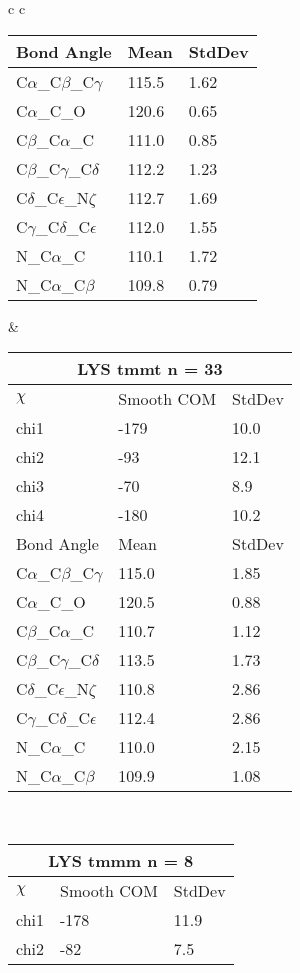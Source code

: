 \begin{longtable}{ c c }
\begin{tabular}{ l l l }
  Bond Angle   & Mean     & StdDev \\ \midrule
  C$\alpha$\_C$\beta$\_C$\gamma$ & 115.5 & 1.62\\
  C$\alpha$\_C\_O & 120.6 & 0.65\\
  C$\beta$\_C$\alpha$\_C & 111.0 & 0.85\\
  C$\beta$\_C$\gamma$\_C$\delta$ & 112.2 & 1.23\\
  C$\delta$\_C$\epsilon$\_N$\zeta$ & 112.7 & 1.69\\
  C$\gamma$\_C$\delta$\_C$\epsilon$ & 112.0 & 1.55\\
  N\_C$\alpha$\_C & 110.1 & 1.72\\
  N\_C$\alpha$\_C$\beta$ & 109.8 & 0.79\\
  \bottomrule
  \end{tabular}
  &
  \begin{tabular}{ l l l }
  \toprule
  \multicolumn{3}{c}{LYS \textbf{tmmt} n = 33} \\ \toprule
  $\chi$       & Smooth COM & StdDev \\ \midrule
  chi1 & -179 & 10.0 \\ 
  chi2 & -93 & 12.1 \\ 
  chi3 & -70 & 8.9 \\ 
  chi4 & -180 & 10.2 \\ \midrule
  Bond Angle   & Mean     & StdDev \\ \midrule
  C$\alpha$\_C$\beta$\_C$\gamma$ & 115.0 & 1.85\\
  C$\alpha$\_C\_O & 120.5 & 0.88\\
  C$\beta$\_C$\alpha$\_C & 110.7 & 1.12\\
  C$\beta$\_C$\gamma$\_C$\delta$ & 113.5 & 1.73\\
  C$\delta$\_C$\epsilon$\_N$\zeta$ & 110.8 & 2.86\\
  C$\gamma$\_C$\delta$\_C$\epsilon$ & 112.4 & 2.86\\
  N\_C$\alpha$\_C & 110.0 & 2.15\\
  N\_C$\alpha$\_C$\beta$ & 109.9 & 1.08\\
  \bottomrule
  \end{tabular}
  \\
  \begin{tabular}{ l l l }
  \toprule
  \multicolumn{3}{c}{LYS \textbf{tmmm} n = 8} \\ \toprule
  $\chi$       & Smooth COM & StdDev \\ \midrule
  chi1 & -178 & 11.9 \\ 
  chi2 & -82 & 7.5 \\ 

\end{tabular}
\end{longtable}
